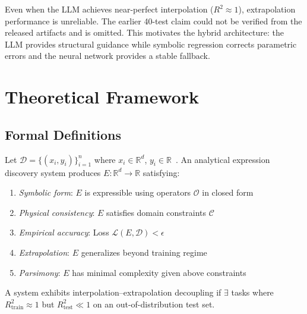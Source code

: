 \documentclass[twoside,11pt]{article}
\newcommand{\Rsq}{R^{2}}
\newcommand{\Rtrain}{R^{2}_{\mathrm{train}}}
\newcommand{\Rtest}{R^{2}_{\mathrm{test}}}
\begin{document}
Even when the LLM achieves near-perfect interpolation ($\Rsq \approx 1$), extrapolation performance is unreliable. The earlier 40-test claim could not be verified from the released artifacts and is omitted. This motivates the hybrid architecture: the LLM provides structural guidance while symbolic regression corrects parametric errors and the neural network provides a stable fallback.

\section{Theoretical Framework}
\label{sec:theory}

\subsection{Formal Definitions}\label{subsec:formal-definitions}
\label{sec:theory_defs}

\begin{definition}
Let $\mathcal{D} = \{(x_i, y_i)\}_{i=1}^n$ where $x_i \in \mathbb{R}^d$, $y_i \in \mathbb{R}$~\citep{udrescu2020ai}. An analytical expression discovery system produces $E: \mathbb{R}^d \to \mathbb{R}$ satisfying:
\begin{enumerate}
  \item \textit{Symbolic form}: $E$ is expressible using operators $\mathcal{O}$ in closed form
  \item \textit{Physical consistency}: $E$ satisfies domain constraints $\mathcal{C}$
  \item \textit{Empirical accuracy}: Loss $\mathcal{L}(E, \mathcal{D}) < \epsilon$
  \item \textit{Extrapolation}: $E$ generalizes beyond training regime
  \item \textit{Parsimony}: $E$ has minimal complexity given above constraints
\end{enumerate}
\end{definition}

\begin{definition}
\label{def:decoupling}
A system exhibits interpolation--extrapolation decoupling if $\exists$ tasks where $\Rtrain \approx 1$ but $\Rtest \ll 1$ on an out-of-distribution test set.
\end{definition}
\end{document}
